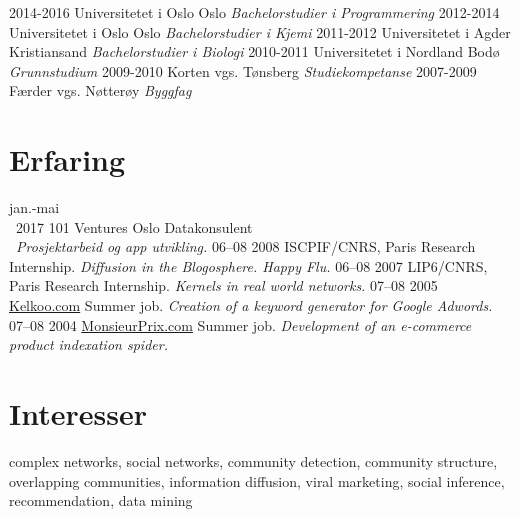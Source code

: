 \documentclass[]{friggeri-cv}
\begin{document}
\begin{entrylist}
  \entry
    {2014-2016}
    {Universitetet i Oslo}
    {Oslo}
    {\emph{Bachelorstudier i Programmering}}
  \entry
    {2012-2014}
    {Universitetet i Oslo}
    {Oslo}
    {\emph{Bachelorstudier i Kjemi}}  
  \entry
    {2011-2012}
    {Universitetet i Agder}
    {Kristiansand}
    {\emph{Bachelorstudier i Biologi}}
  \entry
    {2010-2011}
    {Universitetet i Nordland}
    {Bodø}
    {\emph{Grunnstudium}}
  \entry
    {2009-2010}
    {Korten vgs.}
    {Tønsberg}
    {\emph{Studiekompetanse}}
  \entry
    {2007-2009}
    {Færder vgs.}
    {Nøtterøy}
    {\emph{Byggfag}}
\end{entrylist}

\section{Erfaring}

\begin{entrylist}
  \entry
    {\hfill jan.-mai \\\ \hfill 2017}
    {101 Ventures}
    {Oslo}
    {Datakonsulent \\\ \emph{Prosjektarbeid og app utvikling.}}
  \entry
    {06–08 2008}
    {ISCPIF/CNRS, Paris}
    {Research Internship.}
    {\emph{Diffusion in the Blogosphere. Happy Flu.}}
  \entry
    {06–08 2007}
    {LIP6/CNRS, Paris}
    {Research Internship.}
    {\emph{Kernels in real world networks.}}
  \entry
    {07–08 2005}
    {\href{http://www.kelkoo.com}{Kelkoo.com}}
    {Summer job.}
    {\emph{Creation of a keyword generator for Google Adwords.}}
  \entry
    {07–08 2004}
    {\href{http://www.monsieurprix.com}{MonsieurPrix.com}}
    {Summer job.}
    {\emph{Development of an e-commerce product indexation spider.}}
\end{entrylist}

\section{Interesser}

complex networks, social networks, community detection, community structure,
overlapping communities, information diffusion, viral marketing, social
inference, recommendation, data mining
\end{document}
